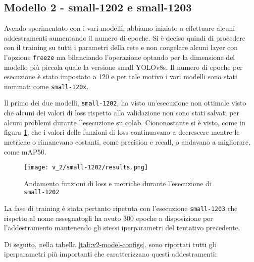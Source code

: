 \subsection*{Modello 2 - small-1202 e small-1203}

Avendo sperimentato con i vari modelli, abbiamo iniziato a effettuare alcuni addestramenti aumentando il
numero di epoche. Si è deciso quindi di procedere con il training su tutti i parametri della rete e non
congelare alcuni layer con l'opzione \verb|freeze| ma bilanciando l'operazione optando per la dimensione
del modello più piccola quale la versione small YOLOv8s. Il numero di epoche per esecuzione è stato impostato a 120 e per tale motivo i vari modelli sono stati
nominati come \verb|small-120x|. 

Il primo dei due modelli, \verb|small-1202|, ha visto un'esecuzione non ottimale visto che alcuni dei valori di loss rispetto alla validazione non sono stati 
salvati per alcuni problemi durante l'esecuzione su colab. Ciononostante si è visto, come in figura
\ref{fig:v2-1}, che i valori delle funzioni di loss continuavano a decrescere mentre le metriche
o rimanevano costanti, come precision e recall, o andavano a migliorare, come mAP50.

\begin{figure}[h]
    \centering
    \texttt{[image: v\_2/small-1202/results.png]}
    \caption{Andamento funzioni di loss e metriche durante l'esecuzione di \texttt{small-1202}}
    \label{fig:v2-1}
\end{figure}

La fase di training è stata pertanto ripetuta con l'esecuzione \verb|small-1203| che rispetto al nome assegnatogli
ha avuto 300 epoche a disposizione per l'addestramento mantenendo gli stessi iperparametri del tentativo precedente.

Di seguito, nella tabella \ref{tab:v2-model-configs}, sono riportati tutti gli iperparametri più importanti che caratterizzano questi addestramenti:

